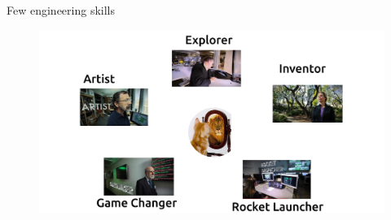 {
\begin{frame}{Few engineering skills}
    \vspace{-00mm}
      \begin{figure}
        \centering
        \includegraphics[width=\linewidth]{./figs/eng-of-the-future/versions/drawing-v01.png}
        \caption{}
      \end{figure}
\end{frame}
}


